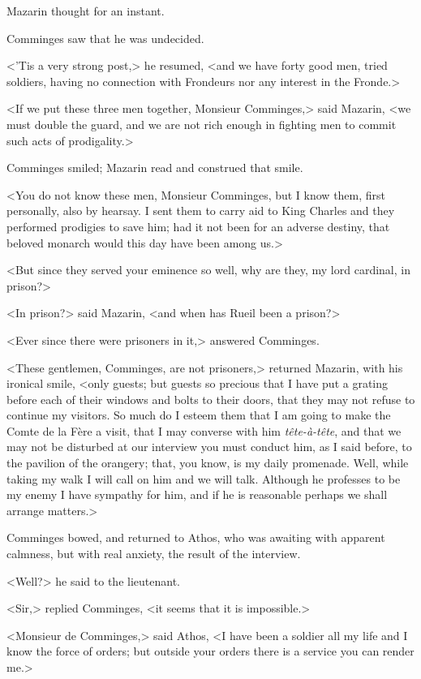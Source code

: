 Mazarin thought for an instant.

Comminges saw that he was undecided.

<'Tis a very strong post,> he resumed, <and we have forty good men, tried soldiers, having no connection with Frondeurs nor any interest in the Fronde.>

<If we put these three men together, Monsieur Comminges,> said Mazarin, <we must double the guard, and we are not rich enough in fighting men to commit such acts of prodigality.>

Comminges smiled; Mazarin read and construed that smile.

<You do not know these men, Monsieur Comminges, but I know them, first personally, also by hearsay. I sent them to carry aid to King Charles and they performed prodigies to save him; had it not been for an adverse destiny, that beloved monarch would this day have been among us.>

<But since they served your eminence so well, why are they, my lord cardinal, in prison?>

<In prison?> said Mazarin, <and when has Rueil been a prison?>

<Ever since there were prisoners in it,> answered Comminges.

<These gentlemen, Comminges, are not prisoners,> returned Mazarin, with his ironical smile, <only guests; but guests so precious that I have put a grating before each of their windows and bolts to their doors, that they may not refuse to continue my visitors. So much do I esteem them that I am going to make the Comte de la Fère a visit, that I may converse with him \textit{tête-à-tête}, and that we may not be disturbed at our interview you must conduct him, as I said before, to the pavilion of the orangery; that, you know, is my daily promenade. Well, while taking my walk I will call on him and we will talk. Although he professes to be my enemy I have sympathy for him, and if he is reasonable perhaps we shall arrange matters.>

Comminges bowed, and returned to Athos, who was awaiting with apparent calmness, but with real anxiety, the result of the interview.

<Well?> he said to the lieutenant.

<Sir,> replied Comminges, <it seems that it is impossible.>

<Monsieur de Comminges,> said Athos, <I have been a soldier all my life and I know the force of orders; but outside your orders there is a service you can render me.>

